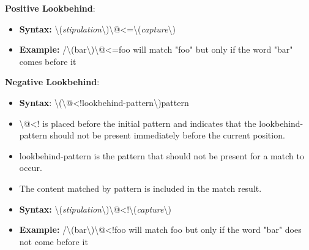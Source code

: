 \documentclass{report}
\begin{document}
    \bigbreak \noindent 
    \textbf{Positive Lookbehind}:
    \begin{itemize}
        \item \textbf{Syntax:} \textbackslash(\textit{stipulation}\textbackslash)\textbackslash @<=\textbackslash(\textit{capture}\textbackslash)
        \item \textbf{Example:} /\textbackslash(bar\textbackslash)\textbackslash @<=foo will match "foo" but only if the word "bar" comes before it
    \end{itemize}

    \bigbreak \noindent 
    \textbf{Negative Lookbehind}:
    \begin{itemize}
        \item \textbf{Syntax}: \textbackslash(\textbackslash @<!lookbehind-pattern\textbackslash)pattern
        \item \textbackslash @<! is placed before the initial pattern and indicates that the lookbehind-pattern should not be present immediately before the current position.
        \item lookbehind-pattern is the pattern that should not be present for a match to occur.
        \item The content matched by pattern is included in the match result.
        \item \textbf{Syntax:} \textbackslash(\textit{stipulation}\textbackslash)\textbackslash @<!\textbackslash(\textit{capture}\textbackslash)
        \item \textbf{Example:} /\textbackslash(bar\textbackslash)\textbackslash @<!foo will match foo but only if the word "bar" does not come before it
    \end{itemize}




    \pagebreak
    \bigbreak
    \noindent
\end{document}
